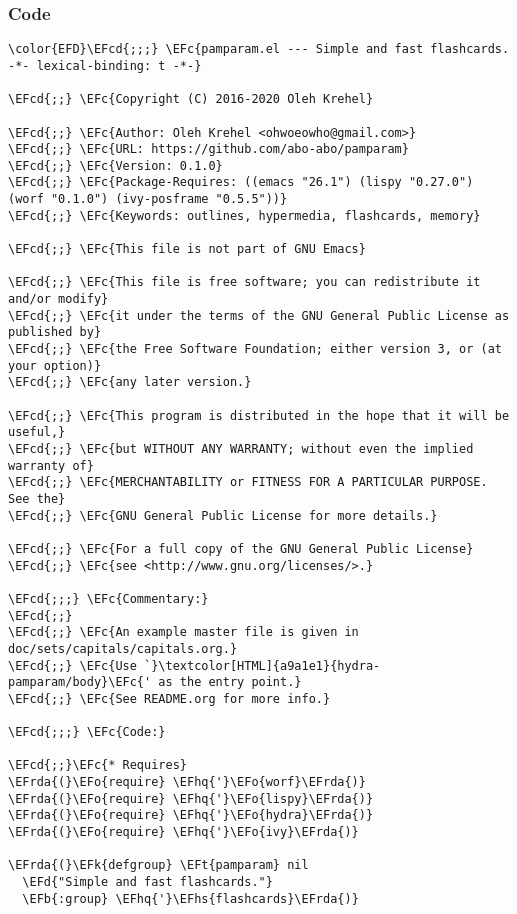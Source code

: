 \documentclass[a4wide,10pt]{article}
\newcommand{\EFc}[1]{\textcolor{EFc}{#1}} %
\newcommand{\EFcd}[1]{\textcolor{EFcd}{#1}} %
\newcommand{\EFd}[1]{\textcolor{EFd}{#1}} %
\newcommand{\EFk}[1]{\textcolor{EFk}{#1}} %
\newcommand{\EFb}[1]{\textcolor{EFb}{#1}} %
\newcommand{\EFt}[1]{\textcolor{EFt}{#1}} %
\newcommand{\EFo}[1]{\textcolor{EFo}{#1}} %
\newcommand{\EFhq}[1]{\textcolor{EFhq}{#1}} %
\newcommand{\EFhs}[1]{\textcolor{EFhs}{#1}} %
\newcommand{\EFrda}[1]{\textcolor{EFrda}{#1}} %
\begin{document}
\subsubsection{Code}
\label{sec:orgd7f1810}
\begin{Code}
\begin{Verbatim}
\color{EFD}\EFcd{;;;} \EFc{pamparam.el --- Simple and fast flashcards. -*- lexical-binding: t -*-}

\EFcd{;;} \EFc{Copyright (C) 2016-2020 Oleh Krehel}

\EFcd{;;} \EFc{Author: Oleh Krehel <ohwoeowho@gmail.com>}
\EFcd{;;} \EFc{URL: https://github.com/abo-abo/pamparam}
\EFcd{;;} \EFc{Version: 0.1.0}
\EFcd{;;} \EFc{Package-Requires: ((emacs "26.1") (lispy "0.27.0") (worf "0.1.0") (ivy-posframe "0.5.5"))}
\EFcd{;;} \EFc{Keywords: outlines, hypermedia, flashcards, memory}

\EFcd{;;} \EFc{This file is not part of GNU Emacs}

\EFcd{;;} \EFc{This file is free software; you can redistribute it and/or modify}
\EFcd{;;} \EFc{it under the terms of the GNU General Public License as published by}
\EFcd{;;} \EFc{the Free Software Foundation; either version 3, or (at your option)}
\EFcd{;;} \EFc{any later version.}

\EFcd{;;} \EFc{This program is distributed in the hope that it will be useful,}
\EFcd{;;} \EFc{but WITHOUT ANY WARRANTY; without even the implied warranty of}
\EFcd{;;} \EFc{MERCHANTABILITY or FITNESS FOR A PARTICULAR PURPOSE.  See the}
\EFcd{;;} \EFc{GNU General Public License for more details.}

\EFcd{;;} \EFc{For a full copy of the GNU General Public License}
\EFcd{;;} \EFc{see <http://www.gnu.org/licenses/>.}

\EFcd{;;;} \EFc{Commentary:}
\EFcd{;;}
\EFcd{;;} \EFc{An example master file is given in doc/sets/capitals/capitals.org.}
\EFcd{;;} \EFc{Use `}\textcolor[HTML]{a9a1e1}{hydra-pamparam/body}\EFc{' as the entry point.}
\EFcd{;;} \EFc{See README.org for more info.}

\EFcd{;;;} \EFc{Code:}

\EFcd{;;}\EFc{* Requires}
\EFrda{(}\EFo{require} \EFhq{'}\EFo{worf}\EFrda{)}
\EFrda{(}\EFo{require} \EFhq{'}\EFo{lispy}\EFrda{)}
\EFrda{(}\EFo{require} \EFhq{'}\EFo{hydra}\EFrda{)}
\EFrda{(}\EFo{require} \EFhq{'}\EFo{ivy}\EFrda{)}

\EFrda{(}\EFk{defgroup} \EFt{pamparam} nil
  \EFd{"Simple and fast flashcards."}
  \EFb{:group} \EFhq{'}\EFhs{flashcards}\EFrda{)}


\end{Verbatim}
\end{Code}
\end{document}
